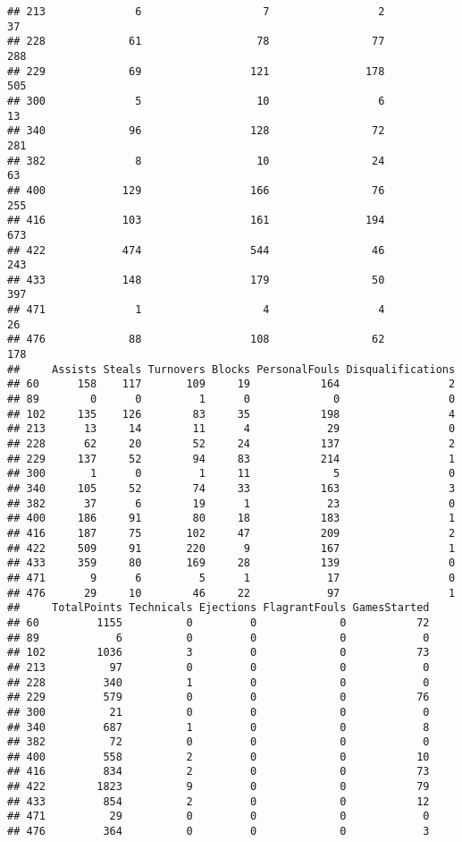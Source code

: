\documentclass[]{book}
\begin{document}
\begin{verbatim}
## 213              6                   7                 2            37
## 228             61                  78                77           288
## 229             69                 121               178           505
## 300              5                  10                 6            13
## 340             96                 128                72           281
## 382              8                  10                24            63
## 400            129                 166                76           255
## 416            103                 161               194           673
## 422            474                 544                46           243
## 433            148                 179                50           397
## 471              1                   4                 4            26
## 476             88                 108                62           178
##     Assists Steals Turnovers Blocks PersonalFouls Disqualifications
## 60      158    117       109     19           164                 2
## 89        0      0         1      0             0                 0
## 102     135    126        83     35           198                 4
## 213      13     14        11      4            29                 0
## 228      62     20        52     24           137                 2
## 229     137     52        94     83           214                 1
## 300       1      0         1     11             5                 0
## 340     105     52        74     33           163                 3
## 382      37      6        19      1            23                 0
## 400     186     91        80     18           183                 1
## 416     187     75       102     47           209                 2
## 422     509     91       220      9           167                 1
## 433     359     80       169     28           139                 0
## 471       9      6         5      1            17                 0
## 476      29     10        46     22            97                 1
##     TotalPoints Technicals Ejections FlagrantFouls GamesStarted
## 60         1155          0         0             0           72
## 89            6          0         0             0            0
## 102        1036          3         0             0           73
## 213          97          0         0             0            0
## 228         340          1         0             0            0
## 229         579          0         0             0           76
## 300          21          0         0             0            0
## 340         687          1         0             0            8
## 382          72          0         0             0            0
## 400         558          2         0             0           10
## 416         834          2         0             0           73
## 422        1823          9         0             0           79
## 433         854          2         0             0           12
## 471          29          0         0             0            0
## 476         364          0         0             0            3
\end{verbatim}
\end{document}
